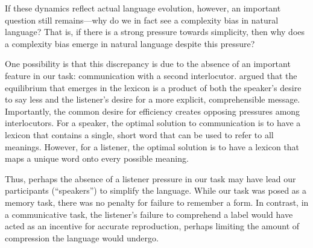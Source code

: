 
If these dynamics reflect actual language evolution, however, an important question still remains---why do we in fact see a complexity bias in natural language? That is, if there is a strong pressure towards simplicity, then why does a complexity bias emerge in natural language despite this pressure? 

One possibility is that this discrepancy is due to the absence of an important feature in our task: communication with a second interlocutor.  argued that the equilibrium that emerges in the lexicon is a product of both the speaker's desire to say less and the listener's desire for a more explicit, comprehensible message. Importantly, the common desire for efficiency creates opposing pressures among interlocutors. For a speaker, the optimal solution to communication is to have a lexicon that contains a single, short word that can be used to refer to all meanings. However, for a listener, the optimal solution is to have a lexicon that maps a unique word onto every possible meaning. 

Thus, perhaps the absence of a listener pressure in our task may have lead our participants (``speakers'') to simplify the language. While our task was posed as a memory task, there was no penalty for failure to remember a form. In contrast, in a communicative task, the listener's failure to comprehend a label would have acted as an incentive for accurate reproduction, perhaps limiting the amount of compression the language would undergo. 



